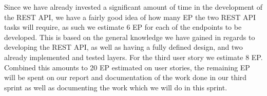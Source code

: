 \bigskip \noindent
Since we have already invested a significant amount of time in the development of the REST API, we have a fairly good idea of how many EP the two REST API tasks will require, as such we estimate 6 EP for each of the endpoints to be developed.
This is based on the general knowledge we have gained in regards to developing the REST API, as well as having a fully defined design, and two already implemented and tested layers.%
For the third user story we estimate 8 EP.
Combined this amounts to 20 EP estimated on user stories, the remaining EP will be spent on our report and documentation of the work done in our third sprint as well as documenting the work which we will do in this sprint.
